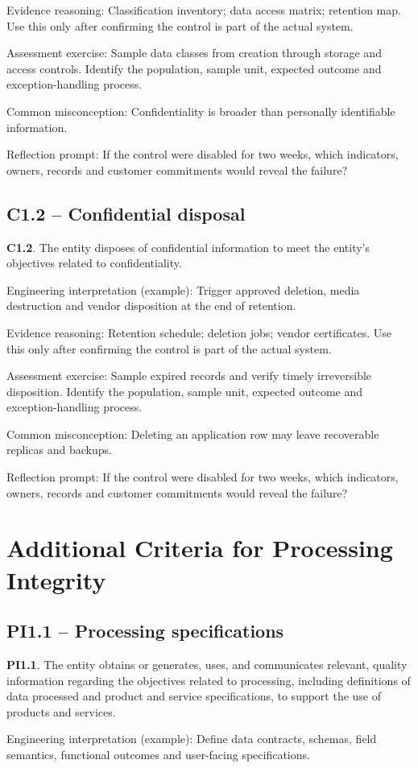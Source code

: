 \documentclass[10pt,oneside]{report}
\begin{document}
Evidence reasoning: Classification inventory; data access matrix; retention map. Use this only after confirming the control is part of the actual system.

Assessment exercise: Sample data classes from creation through storage and access controls. Identify the population, sample unit, expected outcome and exception-handling process.

Common misconception: Confidentiality is broader than personally identifiable information.

Reflection prompt: If the control were disabled for two weeks, which indicators, owners, records and customer commitments would reveal the failure?

\subsection{C1.2 -- Confidential disposal}
\begin{aicpabox}
\textbf{C1.2}. The entity disposes of confidential information to meet the entity's objectives related to confidentiality.\par{}
\end{aicpabox}
Engineering interpretation (example): Trigger approved deletion, media destruction and vendor disposition at the end of retention.

Evidence reasoning: Retention schedule; deletion jobs; vendor certificates. Use this only after confirming the control is part of the actual system.

Assessment exercise: Sample expired records and verify timely irreversible disposition. Identify the population, sample unit, expected outcome and exception-handling process.

Common misconception: Deleting an application row may leave recoverable replicas and backups.

Reflection prompt: If the control were disabled for two weeks, which indicators, owners, records and customer commitments would reveal the failure?

\section{Additional Criteria for Processing Integrity}
\subsection{PI1.1 -- Processing specifications}
\begin{aicpabox}
\textbf{PI1.1}. The entity obtains or generates, uses, and communicates relevant, quality information regarding the objectives related to processing, including definitions of data processed and product and service specifications, to support the use of products and services.\par{}
\end{aicpabox}
Engineering interpretation (example): Define data contracts, schemas, field semantics, functional outcomes and user-facing specifications.
\end{document}
